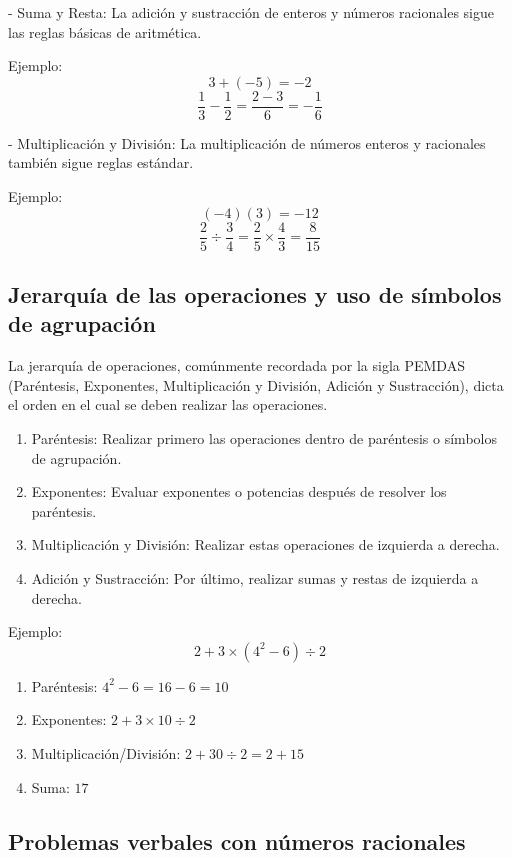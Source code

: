 - Suma y Resta: La adición y sustracción de enteros y números racionales sigue las reglas básicas de aritmética.
  
  Ejemplo:
  \[
  3 + (-5) = -2
  \]
  \[
  \frac{1}{3} - \frac{1}{2} = \frac{2 - 3}{6} = -\frac{1}{6}
  \]

- Multiplicación y División: La multiplicación de números enteros y racionales también sigue reglas estándar.

  Ejemplo:
  \[
  (-4)(3) = -12
  \]
  \[
  \frac{2}{5} \div \frac{3}{4} = \frac{2}{5} \times \frac{4}{3} = \frac{8}{15}
  \]

\subsection{Jerarquía de las operaciones y uso de símbolos de agrupación}

La jerarquía de operaciones, comúnmente recordada por la sigla PEMDAS (Paréntesis, Exponentes, Multiplicación y División, Adición y Sustracción), dicta el orden en el cual se deben realizar las operaciones.

\begin{enumerate}
    \item Paréntesis: Realizar primero las operaciones dentro de paréntesis o símbolos de agrupación.
    \item Exponentes: Evaluar exponentes o potencias después de resolver los paréntesis.
    \item Multiplicación y División: Realizar estas operaciones de izquierda a derecha.
    \item Adición y Sustracción: Por último, realizar sumas y restas de izquierda a derecha.
\end{enumerate}
Ejemplo:
\[
2 + 3 \times (4^2 - 6) \div 2
\]
\begin{enumerate}
    \item  Paréntesis: \( 4^2 - 6 = 16 - 6 = 10 \)
    \item  Exponentes: \( 2 + 3 \times 10 \div 2 \)
    \item  Multiplicación/División: \( 2 + 30 \div 2 = 2 + 15 \)
    \item  Suma: \( 17 \)
\end{enumerate}

\subsection{Problemas verbales con números racionales}

